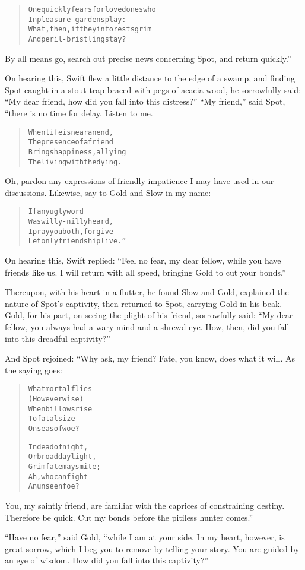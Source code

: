 \documentclass[article, twoside, 14pt]{memoir}
\renewenvironment{verbatim}{%
\begin{quote}%
\vskip -10pt%
\begin{alltt}\normalfont\large}{\end{alltt}%
\end{quote}%
\vskip -10pt
} %
\begin{document}
\begin{verbatim}
One quickly fears for loved ones who
    In pleasure-gardens play:
What, then, if they in forests grim
    And peril-bristling stay?
\end{verbatim}
By all means go, search out precise news concerning Spot, and
return quickly.”

On hearing this, Swift flew a little distance to the edge of a
swamp, and finding Spot caught in a stout trap braced with pegs of
acacia-wood, he sorrowfully said:
``My dear friend, how did you fall into this distress?''
``My friend,'' said Spot, “there is no time for delay. Listen to
me.

\begin{verbatim}
When life is near an end,
The presence of a friend
Brings happiness, allying
The living with the dying.
\end{verbatim}
Oh, pardon any expressions of friendly impatience I may have used
in our discussions. Likewise, say to Gold and Slow in my name:


\begin{verbatim}
If any ugly word
Was willy-nilly heard,
I pray you both, forgive{\textemdash}
Let only friendship live.”
\end{verbatim}
On hearing this, Swift replied:
``Feel no fear, my dear fellow, while you have friends like us. I will return with all speed, bringing Gold to cut your bonds.''

Thereupon, with his heart in a flutter, he found Slow and Gold,
explained the nature of Spot's captivity, then returned to Spot,
carrying Gold in his beak. Gold, for his part, on seeing the plight
of his friend, sorrowfully said:
``My dear fellow, you always had a wary mind and a shrewd eye. How, then, did you fall into this dreadful captivity?''

And Spot rejoined: “Why ask, my friend? Fate, you know, does what
it will. As the saying goes:

\begin{verbatim}
What mortal flies
(However wise)
When billows rise
To fatal size
    On seas of woe?

In dead of night,
Or broad daylight,
Grim fate may smite;
Ah, who can fight
    An unseen foe?
\end{verbatim}
You, my saintly friend, are familiar with the caprices of
constraining destiny. Therefore be quick. Cut my bonds before the
pitiless hunter comes.”

``Have no fear,'' said Gold,
``while I am at your side. In my heart, however, is great sorrow, which I beg you to remove by telling your story. You are guided by an eye of wisdom. How did you fall into this captivity?''
\end{document}
